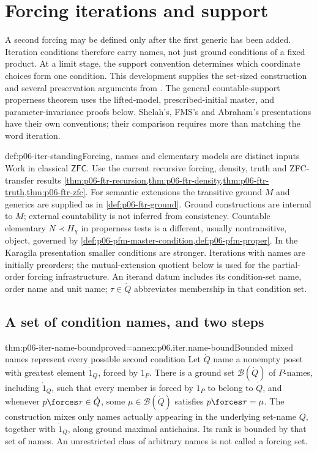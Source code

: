 \section{Forcing iterations and support}
\label{sec:p06-forcing-iterations-support}

A second forcing may be defined only after the first generic has been
added. Iteration conditions therefore carry names, not just ground
conditions of a fixed product. At a limit stage, the support convention
determines which coordinate choices form one condition. This development
supplies the set-sized construction and several preservation arguments
from \cite[\S\S6.1--6.2]{Karagila2026ForcingNotes}. The general
countable-support properness theorem uses the lifted-model, prescribed-initial
master, and parameter-invariance proofs below. Shelah's, FMS's and Abraham's presentations have their own
conventions; their comparison requires more than matching the word iteration.

\begin{hbconvention}{def:p06-iter-standing}{Forcing, names and elementary models are distinct inputs}
Work in classical \(\mathsf{ZFC}\). Use the current recursive forcing,
density, truth and ZFC-transfer results
\cref{thm:p06-ftr-recursion,thm:p06-ftr-density,thm:p06-ftr-truth,thm:p06-ftr-zfc}.
For semantic extensions the transitive ground \(M\) and generics are
supplied as in \cref{def:p06-ftr-ground}. Ground constructions are
internal to \(M\); external countability is not inferred from consistency.
Countable elementary \(N\prec H_\chi\) in properness tests is a
different, usually nontransitive, object, governed by
\cref{def:p06-pfm-master-condition,def:p06-pfm-proper}.
In the Karagila presentation smaller conditions are stronger. Iterations
with names are initially preorders; the mutual-extension quotient below
is used for the partial-order forcing infrastructure.
An iterand datum includes its condition-set name, order name and unit
name; \(\tau\in\dot Q\) abbreviates membership in that condition set.
\end{hbconvention}

\subsection{A set of condition names, and two steps}

\begin{hblemma}{thm:p06-iter-name-bound}{proved=annex:p06.iter.name-bound}{Bounded mixed names represent every possible second condition}
Let \(\dot Q\) name a nonempty poset with greatest element
\(\dot 1_Q\), forced by \(1_P\). There is a ground set
\(\mathcal B(\dot Q)\) of \(P\)-names, including \(\dot 1_Q\), such
that every member is forced by \(1_P\) to belong to \(\dot Q\), and
whenever \(p\forces\tau\in\dot Q\), some
\(\mu\in\mathcal B(\dot Q)\) satisfies \(p\forces\tau=\mu\).
The construction mixes only names actually appearing in the underlying
set-name \(\dot Q\), together with \(\dot 1_Q\), along ground maximal
antichains. Its rank is bounded by that set of names. An unrestricted
class of arbitrary names is not called a forcing set.
\end{hblemma}

